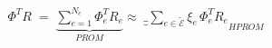 \documentclass[preview]{standalone}
\begin{document}
\begin{align*}
\Phi^{T}R \;=\; \underbrace{\sum_{e=1}^{N_e} \Phi_{e}^{T} R_{e}}_{PROM}\approx\; \underbrace_{\sum_{e\in\tilde{\mathcal{E}}} \xi_e\, \Phi_{e}^{T} R_{e}}_{HPROM}
\end{align*}
\end{document}
